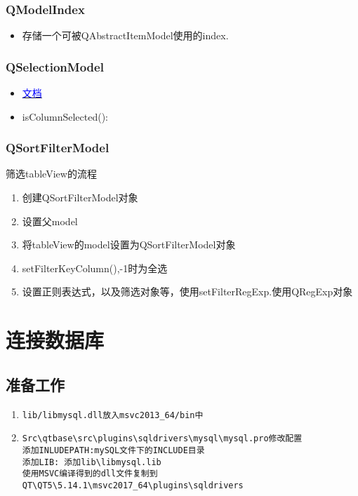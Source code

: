 \documentclass[11pt]{article}
\begin{document}
\subsubsection{QModelIndex}
\begin{itemize}
\item 存储一个可被QAbstractItemModel使用的index.
\end{itemize}






\subsubsection{QSelectionModel}
\begin{itemize}
\item 
\href{https://doc.qt.io/qt-5/qitemselectionmodel.html#columnIntersectsSelection}{
\textcolor{blue}{文档}}
\item isColumnSelected():
\end{itemize}










\subsubsection{QSortFilterModel}
筛选tableView的流程
\begin{enumerate}
\item 创建QSortFilterModel对象
\item 设置父model
\item 将tableView的model设置为QSortFilterModel对象
\item setFilterKeyColumn(),-1时为全选
\item 设置正则表达式，以及筛选对象等，使用setFilterRegExp.使用QRegExp对象
\end{enumerate}



\newpage
\section{连接数据库}
\subsection{准备工作}
\begin{enumerate}
\item 
\begin{verbatim}lib/libmysql.dll放入msvc2013_64/bin中
\end{verbatim}
\item 
\begin{verbatim}
Src\qtbase\src\plugins\sqldrivers\mysql\mysql.pro修改配置
添加INLUDEPATH:mySQL文件下的INCLUDE目录
添加LIB: 添加lib\libmysql.lib
使用MSVC编译得到的dll文件复制到QT\QT5\5.14.1\msvc2017_64\plugins\sqldrivers
\end{verbatim}
\end{enumerate}
\end{document}
